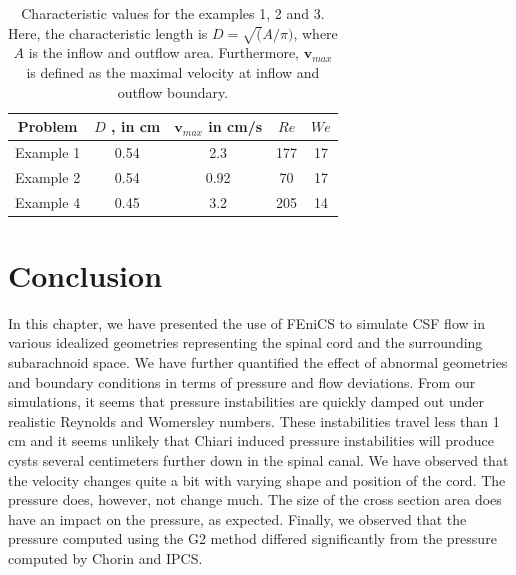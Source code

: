 \begin{table}
\center
\begin{tabular}{ | c | c | c | c | c |}
\hline
Problem & $D$ ,  in cm & $\mathbf{v}_{max}$ in cm/s  & $Re$ & $We$ \\ \hline\hline
	Example 1 	&	0.54 & 2.3 & 177 & 17	\\ \hline
	Example 2	&	0.54 & 0.92 & 70 & 17	\\ \hline
	Example 4	&	0.45 & 3.2 	& 205 & 14	\\ \hline
    \end{tabular}
	\caption{Characteristic values for the examples 1, 2 and 3. Here,
	the characteristic length is $D=\sqrt(A/\pi)$, where $A$ is the
	inflow and outflow area.  Furthermore, $\mathbf{v}_{max}$ is
	defined as the maximal velocity at inflow and outflow boundary.}
	\label{tab:Re_We}
\end{table}

\section{Conclusion}

In this chapter, we have presented the use of FEniCS to simulate CSF
flow in various idealized geometries representing the spinal cord and
the surrounding subarachnoid space. We have further quantified the
effect of abnormal geometries and boundary conditions in terms of
pressure and flow deviations. From our simulations, it seems that
pressure instabilities are quickly damped out under realistic Reynolds
and Womersley numbers. These instabilities travel less than 1 cm and
it seems unlikely that Chiari induced pressure instabilities will
produce cysts several centimeters further down in the spinal canal.
We have observed that the velocity changes quite a bit with varying
shape and position of the cord. The pressure does, however, not change
much. The size of the cross section area does have an impact on the
pressure, as expected.  Finally, we observed that the pressure
computed using the G2 method differed significantly from the pressure
computed by Chorin and IPCS.
